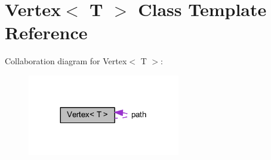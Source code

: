 \hypertarget{class_vertex}{}\section{Vertex$<$ T $>$ Class Template Reference}
\label{class_vertex}


Collaboration diagram for Vertex$<$ T $>$\+:
\nopagebreak
\begin{figure}[H]
\begin{center}
\leavevmode
\includegraphics[width=188pt]{class_vertex__coll__graph}
\end{center}
\end{figure}
